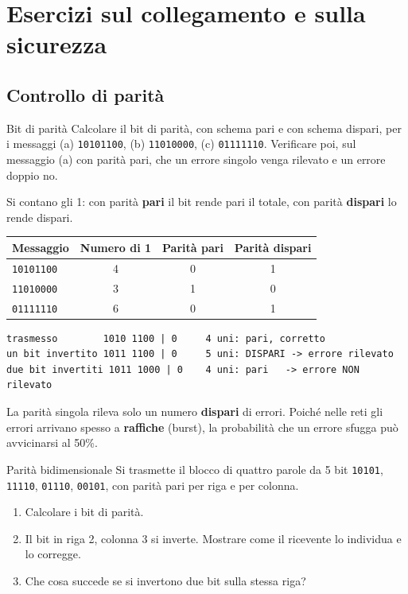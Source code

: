 \chapter{Esercizi sul collegamento e sulla sicurezza}

\section{Controllo di parità}

\begin{esercizio}{Bit di parità}
Calcolare il bit di parità, con schema pari e con schema dispari, per i messaggi
(a) \texttt{10101100}, (b) \texttt{11010000}, (c) \texttt{01111110}. Verificare poi, sul messaggio (a) con parità pari, che un errore
singolo venga rilevato e un errore doppio no.
\end{esercizio}

\svolgimento
Si contano gli 1: con parità \textbf{pari} il bit rende pari il totale, con parità \textbf{dispari} lo rende dispari.
\begin{center}
\begin{tabular}{lccc}
\toprule
\textbf{Messaggio} & \textbf{Numero di 1} & \textbf{Parità pari} & \textbf{Parità dispari} \\
\midrule
\texttt{10101100} & 4 & 0 & 1 \\
\texttt{11010000} & 3 & 1 & 0 \\
\texttt{01111110} & 6 & 0 & 1 \\
\bottomrule
\end{tabular}
\end{center}

\begin{lstlisting}[autogobble=false]
trasmesso        1010 1100 | 0     4 uni: pari, corretto
un bit invertito 1011 1100 | 0     5 uni: DISPARI -> errore rilevato
due bit invertiti 1011 1000 | 0    4 uni: pari   -> errore NON rilevato
\end{lstlisting}

La parità singola rileva solo un numero \textbf{dispari} di errori. Poiché nelle reti gli errori arrivano spesso a
\textbf{raffiche} (burst), la probabilità che un errore sfugga può avvicinarsi al 50\%.

\begin{esercizio}{Parità bidimensionale}
Si trasmette il blocco di quattro parole da 5 bit
\texttt{10101}, \texttt{11110}, \texttt{01110}, \texttt{00101}, con parità pari per riga e per colonna.
\begin{enumerate}[label=(\alph*)]
    \item Calcolare i bit di parità.
    \item Il bit in riga 2, colonna 3 si inverte. Mostrare come il ricevente lo individua e lo corregge.
    \item Che cosa succede se si invertono due bit sulla stessa riga?
\end{enumerate}
\end{esercizio}

